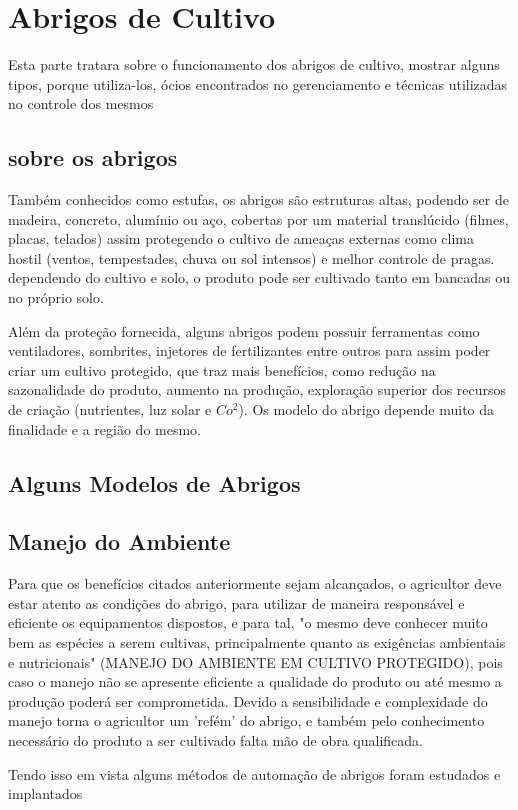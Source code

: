 \chapter{Abrigos de Cultivo}
Esta parte tratara sobre o funcionamento dos abrigos de cultivo, mostrar alguns tipos, porque utiliza-los, ócios encontrados no gerenciamento e técnicas utilizadas no controle dos mesmos
\section{sobre os abrigos}
Também conhecidos como estufas, os abrigos são estruturas altas, podendo ser de madeira, concreto, alumínio ou aço, cobertas por um material translúcido (filmes, placas, telados) assim protegendo o cultivo de ameaças externas como clima hostil (ventos, tempestades, chuva ou sol intensos) e melhor controle de pragas. dependendo do cultivo e solo, o produto pode ser cultivado tanto em bancadas ou no próprio solo.

Além da proteção fornecida, alguns abrigos podem  possuir ferramentas como ventiladores, sombrites, injetores de fertilizantes entre outros para assim poder criar um cultivo protegido, que traz mais benefícios, como redução na sazonalidade do produto, aumento na produção, exploração superior dos recursos de criação (nutrientes, luz solar e $Co^2$). Os modelo do abrigo depende muito da finalidade e a região do mesmo.



\section{Alguns Modelos de Abrigos}

\section{Manejo do Ambiente}
Para que os benefícios citados anteriormente sejam alcançados, o agricultor deve estar atento as condições do abrigo, para utilizar de maneira responsável e eficiente os equipamentos dispostos, e para tal, "o mesmo deve conhecer muito bem as espécies a serem cultivas, principalmente quanto as exigências ambientais e nutricionais" (MANEJO DO AMBIENTE EM CULTIVO PROTEGIDO), pois caso o manejo não se apresente eficiente a qualidade do produto ou até mesmo a produção poderá ser comprometida. Devido a sensibilidade e complexidade do manejo torna o agricultor um 'refém' do abrigo, e também pelo conhecimento necessário do produto a ser cultivado falta mão de obra qualificada.

Tendo isso em vista alguns métodos de automação de abrigos foram estudados e implantados 



